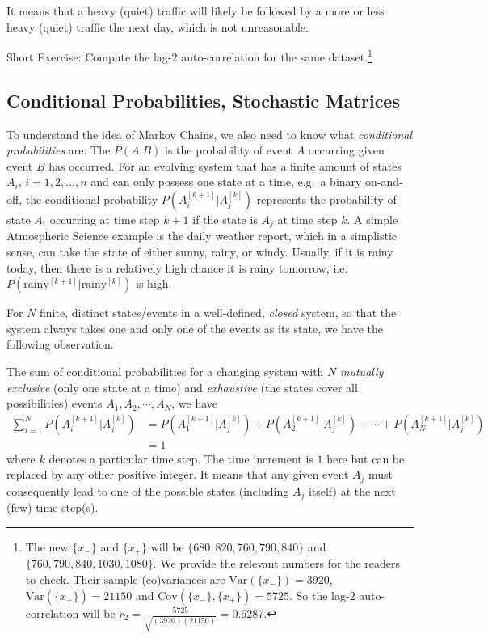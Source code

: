 It means that a heavy (quiet) traffic will likely be followed by a more or less heavy (quiet) traffic the next day, which is not unreasonable.\par
Short Exercise: Compute the lag-$2$ auto-correlation for the same dataset.\footnote{The new $\{x_-\}$ and $\{x_+\}$ will be $\{680, 820, 760, 790, 840\}$ and $\{760, 790, 840, 1030, 1080\}$. We provide the relevant numbers for the readers to check. Their sample (co)variances are $\text{Var}(\{x_-\}) = 3920$, $\text{Var}(\{x_+\}) = 21150$ and $\text{Cov}(\{x_{-}\},\{x_{+}\}) = 5725$. So the lag-$2$ auto-correlation will be $r_2 = \frac{5725}{\sqrt{(3920)(21150)}} = 0.6287$.}


\subsection{Conditional Probabilities, Stochastic Matrices}
To understand the idea of Markov Chains, we also need to know what \textit{conditional probabilities} are. The  $P(A|B)$ is the probability of event $A$ occurring given event $B$ has occurred. For an evolving system that has a finite amount of states $A_i$, $i = 1,2,\ldots,n$ and can only possess one state at a time, e.g.\ a binary on-and-off, the conditional probability $P(A_i^{[k+1]}|A_j^{[k]})$ represents the probability of state $A_i$ occurring at time step $k+1$ if the state is $A_j$ at time step $k$. A simple Atmospheric Science example is the daily weather report, which in a simplistic sense, can take the state of either sunny, rainy, or windy. Usually, if it is rainy today, then there is a relatively high chance it is rainy tomorrow, i.e.\ $P(\text{rainy}^{[k+1]}|\text{rainy}^{[k]})$ is high. \par
For $N$ finite, distinct states/events in a well-defined, \textit{closed} system, so that the system always takes one and only one of the events as its state, we have the following observation.
\begin{proper}
The sum of conditional probabilities for a changing system with $N$ \textit{mutually exclusive} (only one state at a time) and \textit{exhaustive} (the states cover all possibilities) events $A_1, A_2, \cdots, A_N$, we have
\begin{align*}
\sum_{i=1}^N P(A_i^{[k+1]}|A_j^{[k]}) &= P(A_1^{[k+1]}|A_j^{[k]}) + P(A_2^{[k+1]}|A_j^{[k]}) + \cdots + P(A_N^{[k+1]}|A_j^{[k]}) \\
&= 1
\end{align*}
where $k$ denotes a particular time step. The time increment is $1$ here but can be replaced by any other positive integer. It means that any given event $A_j$ must consequently lead to one of the possible states (including $A_j$ itself) at the next (few) time step(s).
\end{proper}
